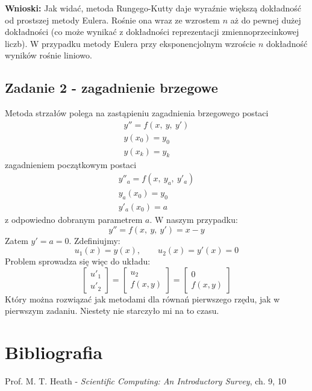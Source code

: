\documentclass{article}
\begin{document}
\vspace{5mm}
\noindent
\textbf{Wnioski:} Jak widać, metoda Rungego-Kutty daje wyraźnie większą dokładność od prostszej metody Eulera. Rośnie ona wraz ze wzrostem \(n\) aż do pewnej dużej dokładności (co może wynikać z dokładności reprezentacji zmiennoprzecinkowej liczb). W przypadku metody Eulera przy eksponencjolnym wzroście \(n\) dokładność wyników rośnie liniowo.

\newpage

\subsection{Zadanie 2 - zagadnienie brzegowe}
Metoda strzałów polega na zastąpieniu zagadnienia brzegowego postaci
\begin{gather*}
    y'' = f(x,\ y,\ y')\\
    y(x_0) = y_0\\
    y(x_k) = y_k
\end{gather*}
zagadnieniem początkowym postaci
\begin{gather*}
    y''_a = f(x,\ y_a,\ y'_a)\\
    y_a(x_0) = y_0\\
    y'_a(x_0) = a
\end{gather*}
z odpowiedno dobranym parametrem \(a\). W naszym przypadku:
\[y'' = f(x,\ y,\ y') = x - y\]
Zatem \(y' = a = 0\). Zdefiniujmy:
\[u_1(x) = y(x), \qquad u_2(x) = y'(x) = 0\]
Problem sprowadza się więc do układu:
\[
\begin{bmatrix}
u'_1 \\ u'_2
\end{bmatrix}
=
\begin{bmatrix}
u_2 \\ f(x, y)
\end{bmatrix}
=
\begin{bmatrix}
0 \\ f(x, y)
\end{bmatrix}
\]
Który można rozwiązać jak metodami dla równań pierwszego rzędu, jak w pierwszym zadaniu. Niestety nie starczyło mi na to czasu.

\section{Bibliografia}
Prof. M. T. Heath - \textit{Scientific Computing: An Introductory Survey}, ch. 9, 10
\end{document}

